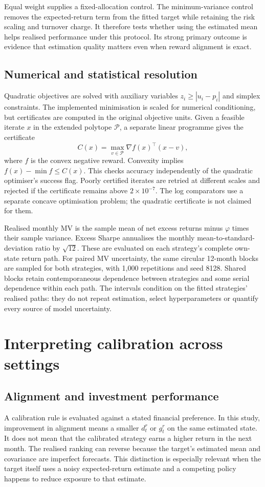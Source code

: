 \documentclass[sigconf,review]{acmart}
\begin{document}
Equal weight supplies a fixed-allocation control. The minimum-variance control removes the expected-return term from the fitted target while retaining the risk scaling and turnover charge. It therefore tests whether using the estimated mean helps realised performance under this protocol. Its strong primary outcome is evidence that estimation quality matters even when reward alignment is exact.

\subsection{Numerical and statistical resolution}
Quadratic objectives are solved with auxiliary variables $z_i\ge |u_i-p_i|$ and simplex constraints. The implemented minimisation is scaled for numerical conditioning, but certificates are computed in the original objective units. Given a feasible iterate $x$ in the extended polytope $\mathcal P$, a separate linear programme gives the certificate
\begin{equation}
 C(x)=\max_{v\in\mathcal P}\nabla f(x)^\top(x-v),
\end{equation}
where $f$ is the convex negative reward. Convexity implies $f(x)-\min f\le C(x)$. This checks accuracy independently of the quadratic optimiser's success flag. Poorly certified iterates are retried at different scales and rejected if the certificate remains above $2\times10^{-7}$. The log comparators use a separate concave optimisation problem; the quadratic certificate is not claimed for them.

Realised monthly MV is the sample mean of net excess returns minus $\varphi$ times their sample variance. Excess Sharpe annualises the monthly mean-to-standard-deviation ratio by $\sqrt{12}$. These are evaluated on each strategy's complete own-state return path. For paired MV uncertainty, the same circular 12-month blocks are sampled for both strategies, with 1,000 repetitions and seed 8128. Shared blocks retain contemporaneous dependence between strategies and some serial dependence within each path. The intervals condition on the fitted strategies' realised paths: they do not repeat estimation, select hyperparameters or quantify every source of model uncertainty.

\section{Interpreting calibration across settings}
\subsection{Alignment and investment performance}
A calibration rule is evaluated against a stated financial preference. In this study, improvement in alignment means a smaller $d_t^r$ or $g_t^r$ on the same estimated state. It does not mean that the calibrated strategy earns a higher return in the next month. The realised ranking can reverse because the target's estimated mean and covariance are imperfect forecasts. This distinction is especially relevant when the target itself uses a noisy expected-return estimate and a competing policy happens to reduce exposure to that estimate.
\end{document}
